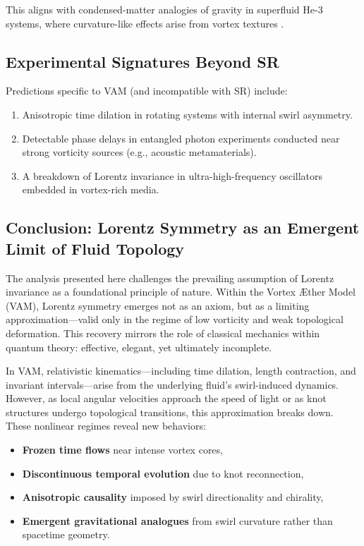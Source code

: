 \documentclass[12pt]{article}
\begin{document}
This aligns with condensed-matter analogies of gravity in superfluid He-3 systems, where curvature-like effects arise from vortex textures \cite{volovik2003universe}.

    \subsection*{Experimental Signatures Beyond SR}

    Predictions specific to VAM (and incompatible with SR) include:
    \begin{enumerate}
        \item Anisotropic time dilation in rotating systems with internal swirl asymmetry.
        \item Detectable phase delays in entangled photon experiments conducted near strong vorticity sources (e.g., acoustic metamaterials).
        \item A breakdown of Lorentz invariance in ultra-high-frequency oscillators embedded in vortex-rich media.
    \end{enumerate}


    \subsection*{Conclusion: Lorentz Symmetry as an Emergent Limit of Fluid Topology}

    The analysis presented here challenges the prevailing assumption of Lorentz invariance as a foundational principle of nature. Within the Vortex Æther Model (VAM), Lorentz symmetry emerges not as an axiom, but as a limiting approximation—valid only in the regime of low vorticity and weak topological deformation. This recovery mirrors the role of classical mechanics within quantum theory: effective, elegant, yet ultimately incomplete.

    In VAM, relativistic kinematics—including time dilation, length contraction, and invariant intervals—arise from the underlying fluid’s swirl-induced dynamics. However, as local angular velocities approach the speed of light or as knot structures undergo topological transitions, this approximation breaks down. These nonlinear regimes reveal new behaviors:
    \begin{itemize}
        \item \textbf{Frozen time flows} near intense vortex cores,
        \item \textbf{Discontinuous temporal evolution} due to knot reconnection,
        \item \textbf{Anisotropic causality} imposed by swirl directionality and chirality,
        \item \textbf{Emergent gravitational analogues} from swirl curvature rather than spacetime geometry.
    \end{itemize}
\end{document}
